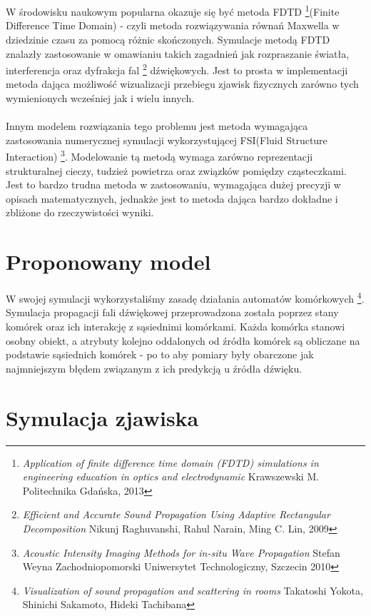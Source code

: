 \documentclass[a4paper, 12pt]{article}
\begin{document}
\\ \\
W środowisku naukowym popularna okazuje się być metoda FDTD \footnote{\textit{Application of finite difference time domain (FDTD) simulations in engineering education in optics and electrodynamic} Krawszewski M. Politechnika Gdańska, 2013}(Finite Difference Time Domain) - czyli metoda rozwiązywania równań Maxwella w dziedzinie czasu za pomocą różnic skończonych. Symulacje metodą FDTD znalazły zastosowanie w omawianiu takich zagadnień jak rozpraszanie światła, interferencja oraz dyfrakcja fal \footnote{\textit{Efficient and Accurate Sound Propagation
Using Adaptive Rectangular Decomposition} Nikunj Raghuvanshi, Rahul Narain, Ming C. Lin, 2009} dźwiękowych. Jest to prosta w implementacji metoda dająca możliwość wizualizacji przebiegu zjawisk fizycznych zarówno tych wymienionych wcześniej jak i wielu innych.
\\ \\
Innym modelem rozwiązania tego problemu jest metoda wymagająca zastosowania numerycznej symulacji wykorzystującej FSI(Fluid Structure Interaction) \footnote{\textit{Acoustic Intensity Imaging Methods for in-situ Wave Propagation} Stefan Weyna Zachodniopomorski Uniwersytet Technologiczny, Szczecin 2010}. Modelowanie tą metodą wymaga zarówno reprezentacji strukturalnej cieczy, tudzież powietrza oraz związków pomiędzy cząsteczkami. Jest to bardzo trudna metoda w zastosowaniu, wymagająca dużej precyzji w opisach matematycznych, jednakże jest to metoda dająca bardzo dokładne i zbliżone do rzeczywistości wyniki. 
\\

\section{Proponowany model}

W swojej symulacji wykorzystaliśmy zasadę działania automatów komórkowych \footnote{\textit{Visualization of sound propagation and scattering in rooms} Takatoshi Yokota, Shinichi Sakamoto, Hideki Tachibana}. Symulacja propagacji fali dźwiękowej przeprowadzona została poprzez stany komórek oraz ich interakcję z sąsiednimi komórkami. Każda komórka stanowi osobny obiekt, a atrybuty kolejno oddalonych od źródła komórek są obliczane na podstawie sąsiednich komórek - po to aby pomiary były obarczone jak najmniejszym błędem związanym z ich predykcją u źródła dźwięku. 
\\

\section{Symulacja zjawiska}
\end{document}
